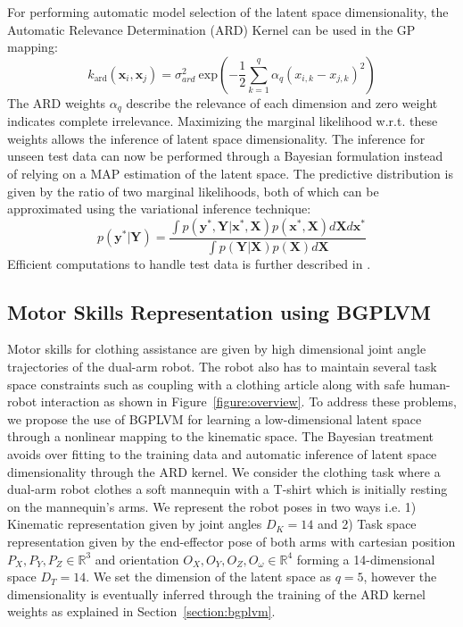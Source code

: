 \documentclass{article}
\begin{document}
For performing automatic model selection of the latent space dimensionality, the Automatic Relevance Determination (ARD) Kernel can be used in the GP mapping:
\begin{equation}
  \label{eqn:ardkernel}
  k_{\text{ard}}(\mathbf{x}_i,\mathbf{x}_j) = \sigma_{ard}^2~\text{exp}\left( - \frac{1}{2} \sum_{k=1}^q{\alpha_q (x_{i,k} - x_{j,k})^2}\right)
\end{equation}
The ARD weights $\alpha_q$ describe the relevance of each dimension and zero weight indicates complete irrelevance. Maximizing the marginal likelihood w.r.t. these weights allows the inference of latent space dimensionality. The inference for unseen test data can now be performed through a Bayesian formulation instead of relying on a MAP estimation of the latent space. The predictive distribution is given by the ratio of two marginal likelihoods, both of which can be approximated using the variational inference technique:
\begin{equation}
	\label{eqn:testinference}
	p(\mathbf{y}^*|\mathbf{Y}) = \frac{\int p(\mathbf{y}^*,\mathbf{Y}|\mathbf{x}^*,\mathbf{X})p(\mathbf{x}^*,\mathbf{X})d\mathbf{X}d\mathbf{x}^*}{\int p(\mathbf{Y}|\mathbf{X})p(\mathbf{X})d\mathbf{X}}
\end{equation}
Efficient computations to handle test data is further described in \cite{bgplvm}.

\subsection{Motor Skills Representation using BGPLVM}
\label{section:clothassist}

Motor skills for clothing assistance are given by high dimensional joint angle trajectories of the dual-arm robot. The robot also has to maintain several task space constraints such as coupling with a clothing article along with safe human-robot interaction as shown in Figure~\ref{figure:overview}. To address these problems, we propose the use of BGPLVM for learning a low-dimensional latent space through a nonlinear mapping to the kinematic space. The Bayesian treatment avoids over fitting to the training data and automatic inference of latent space dimensionality through the ARD kernel. We consider the clothing task where a dual-arm robot clothes a soft mannequin with a T-shirt which is initially resting on the mannequin's arms. We represent the robot poses in two ways i.e. 1) Kinematic representation given by joint angles $D_K = 14$ and 2) Task space representation given by the end-effector pose of both arms with cartesian position ${P_X,P_Y,P_Z} \in \mathbb{R}^3$ and orientation ${O_X,O_Y,O_Z,O_{\omega}} \in \mathbb{R}^4$ forming a 14-dimensional space $D_T = 14$. We set the dimension of the latent space as $q = 5$, however the dimensionality is eventually inferred through the training of the ARD kernel weights as explained in Section~\ref{section:bgplvm}.
\end{document}
